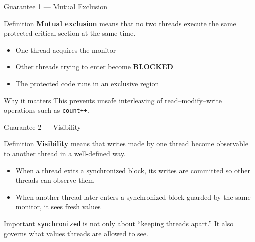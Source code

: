 \documentclass[aspectratio=169,11pt]{beamer}
\begin{document}
	\begin{frame}{Guarantee 1 --- Mutual Exclusion}
		\begin{block}{Definition}
			\textbf{Mutual exclusion} means that no two threads execute the same protected critical section at the same time.
		\end{block}
		
		\bigskip
		
		\begin{itemize}
			\item One thread acquires the monitor
			\item Other threads trying to enter become \textbf{BLOCKED}
			\item The protected code runs in an exclusive region
		\end{itemize}
		
		\bigskip
		
		\begin{alertblock}{Why it matters}
			This prevents unsafe interleaving of read--modify--write operations such as \texttt{count++}.
		\end{alertblock}
	\end{frame}
	
	\begin{frame}{Guarantee 2 --- Visibility}
		\begin{block}{Definition}
			\textbf{Visibility} means that writes made by one thread become observable to another thread in a well-defined way.
		\end{block}
		
		\bigskip
		
		\begin{itemize}
			\item When a thread exits a synchronized block, its writes are committed so other threads can observe them
			\item When another thread later enters a synchronized block guarded by the same monitor, it sees fresh values
		\end{itemize}
		
		\bigskip
		
		\begin{alertblock}{Important}
			\texttt{synchronized} is not only about “keeping threads apart.”  
			It also governs what values threads are allowed to see.
		\end{alertblock}
	\end{frame}
	
\end{document}
